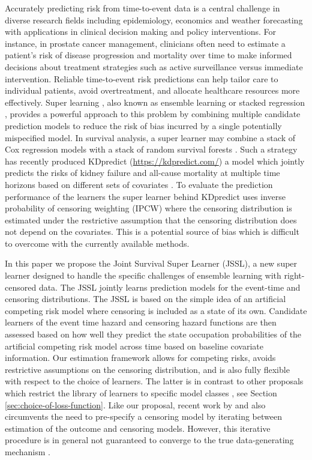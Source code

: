 \documentclass[a4paper,danish]{article}
\theoremstyle{plain} %
\numberwithin{theorem}{section}
\theoremstyle{definition} %
\theoremstyle{remark}
\newcommand{\1}{\mathds{1}}
\begin{document}
Accurately predicting risk from time-to-event data is a central
challenge in diverse research fields including epidemiology, economics
and weather forecasting with applications in clinical
decision making and policy interventions. For instance, in prostate
cancer management, clinicians often need to estimate a patient’s risk
of disease progression and mortality over time to make informed
decisions about treatment strategies such as active surveillance
versus immediate intervention. Reliable time-to-event risk predictions
can help tailor care to individual patients, avoid overtreatment, and
allocate healthcare resources more effectively. Super learning
\citep{van2007super}, also known as ensemble learning or stacked
regression \citep{wolpert1992stacked,breiman1996stacked}, provides a
powerful approach to this problem by combining multiple
candidate prediction models to reduce the risk of bias incurred by a
single potentially mispecified model. In survival analysis, a super
learner may combine a stack of Cox regression models with a stack of
random survival forests \citep[][Section 8.4]{gerds2021medical}. Such
a strategy has recently produced KDpredict
(\url{https://kdpredict.com/}) a model which jointly predicts the
risks of kidney failure and all-cause mortality at multiple time
horizons based on different sets of covariates
\citep{liu2024predicting}. To evaluate the prediction performance of
the learners the super learner behind KDpredict uses inverse
probability of censoring weighting (IPCW) where the censoring
distribution is estimated under the restrictive assumption that the
censoring distribution does not depend on the covariates. This is a
potential source of bias which is difficult to overcome with the
currently available methods.


In this paper we propose the Joint Survival Super Learner (JSSL), a
new super learner designed to handle the specific challenges of
ensemble learning with right-censored data. The JSSL jointly
learns prediction models for the event-time and censoring
distributions. The JSSL is based on the simple idea of an
artificial competing risk model where censoring is included as a state
of its own. Candidate learners of the event time hazard and censoring
hazard functions are then assessed based on how well they predict the
state occupation probabilities of the artificial competing risk model
across time based on baseline covariate information. Our estimation
framework allows for competing risks, avoids restrictive assumptions
on the censoring distribution, and is also fully flexible with respect
to the choice of learners. The latter is in contrast to other
proposals which restrict the library of learners to specific model
classes \citep{polley2011-sl-cens,golmakani2020super}, see Section
\ref{sec:choice-of-loss-function}. Like our proposal, recent work by
\cite{han2021inverse} and \cite{westling2021inference} also
circumvents the need to pre-specify a censoring model by iterating
between estimation of the outcome and censoring models. However, this
iterative procedure is in general not guaranteed to converge to the
true data-generating mechanism
\citep[][Appendix~A.4]{munch2024thesis}.
\end{document}
